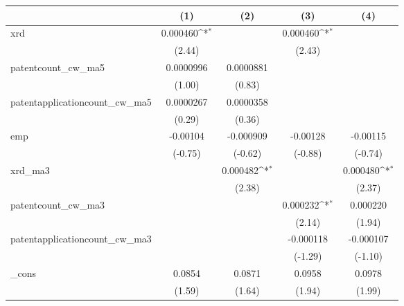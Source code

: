 {
\def\sym#1{\ifmmode^{#1}\else\(^{#1}\)\fi}
\begin{tabular}{l*{4}{c}}
\hline\hline
            &\multicolumn{1}{c}{(1)}         &\multicolumn{1}{c}{(2)}         &\multicolumn{1}{c}{(3)}         &\multicolumn{1}{c}{(4)}         \\
\hline
xrd         &    0.000460\sym{*}  &                     &    0.000460\sym{*}  &                     \\
            &      (2.44)         &                     &      (2.43)         &                     \\
[1em]
patentcount\_cw\_ma5&   0.0000996         &   0.0000881         &                     &                     \\
            &      (1.00)         &      (0.83)         &                     &                     \\
[1em]
patentapplicationcount\_cw\_ma5&   0.0000267         &   0.0000358         &                     &                     \\
            &      (0.29)         &      (0.36)         &                     &                     \\
[1em]
emp         &    -0.00104         &   -0.000909         &    -0.00128         &    -0.00115         \\
            &     (-0.75)         &     (-0.62)         &     (-0.88)         &     (-0.74)         \\
[1em]
xrd\_ma3     &                     &    0.000482\sym{*}  &                     &    0.000480\sym{*}  \\
            &                     &      (2.38)         &                     &      (2.37)         \\
[1em]
patentcount\_cw\_ma3&                     &                     &    0.000232\sym{*}  &    0.000220         \\
            &                     &                     &      (2.14)         &      (1.94)         \\
[1em]
patentapplicationcount\_cw\_ma3&                     &                     &   -0.000118         &   -0.000107         \\
            &                     &                     &     (-1.29)         &     (-1.10)         \\
[1em]
\_cons      &      0.0854         &      0.0871         &      0.0958         &      0.0978         \\
            &      (1.59)         &      (1.64)         &      (1.94)         &      (1.99)         \\

\end{tabular}}
